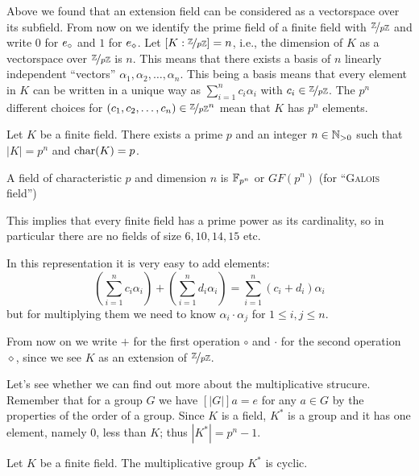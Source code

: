 Above we found that an extension field can be considered as a vectorspace over its subfield. From now on we identify the prime field of a finite field with $\nicefrac{\mathbb{Z}}{p \mathbb{Z}}$ and write $0$ for $e_{\circ}$ and $1$ for $e_{\diamond}$. Let $[K:\nicefrac{\mathbb{Z}}{p \mathbb{Z}}] = n$, i.e., the dimension of $K$ as a vectorspace over $\nicefrac{\mathbb{Z}}{p \mathbb{Z}}$ is $n$. This means that there exists a basis of $n$ linearly independent ``vectors'' $\alpha_1,\alpha_2,\dots,\alpha_n$. This being a basis means that every element in $K$ can be written in a unique way as $\sum\limits_{i=1}^n c_i \alpha_i$ with $c_i \in \nicefrac{\mathbb{Z}}{p \mathbb{Z}}$. The $p^n$ different choices for $(c_1,c_2,\dots,c_n) \in \nicefrac{\mathbb{Z}}{p \mathbb{Z}}^n$ mean that $K$ has $p^n$ elements.

\begin{lemma}
Let $K$ be a finite field. There exists a prime $p$ and an integer $n \in \mathbb{N}_{>0}$ such that $|K| = p^n$ and $\operatorname{char}(K) = p$.
\end{lemma}

\begin{notation}
A field of characteristic $p$ and dimension $n$ is $\mathbb{F}_{p^n}$ or $GF(p^n)$ (for ``\textsc{Galois} field'')
\end{notation}

This implies that every finite field has a prime power as its cardinality, so in particular there are no fields of size $6, 10, 14, 15$ etc.

In this representation it is very easy to add elements:
\[
	\left(\sum\limits_{i=1}^n c_i \alpha_i \right) + \left(\sum\limits_{i=1}^n d_i \alpha_i \right) = \sum\limits_{i=1}^n \left(c_i+d_i\right) \alpha_i
\]
but for multiplying them we need to know $\alpha_i \cdot \alpha_j$ for $1 \leq i,j \leq n$.

\begin{remark}
From now on we write $+$ for the first operation $\circ$ and $\cdot$ for the second operation $\diamond$, since we see $K$ as an extension of $\nicefrac{\mathbb{Z}}{p\mathbb{Z}}$.
\end{remark}

Let's see whether we can find out more about the multiplicative strucure. Remember that for a group $G$ we have $[|G|]a = e$ for any $a \in G$ by the properties of the order of a group. Since $K$ is a field, $K^{\ast}$ is a group and it has one element, namely $0$, less than $K$; thus $|K^{\ast}| = p^n-1$.

\begin{lemma}
Let $K$ be a finite field. The multiplicative group $K^{\ast}$ is cyclic.
\end{lemma}

